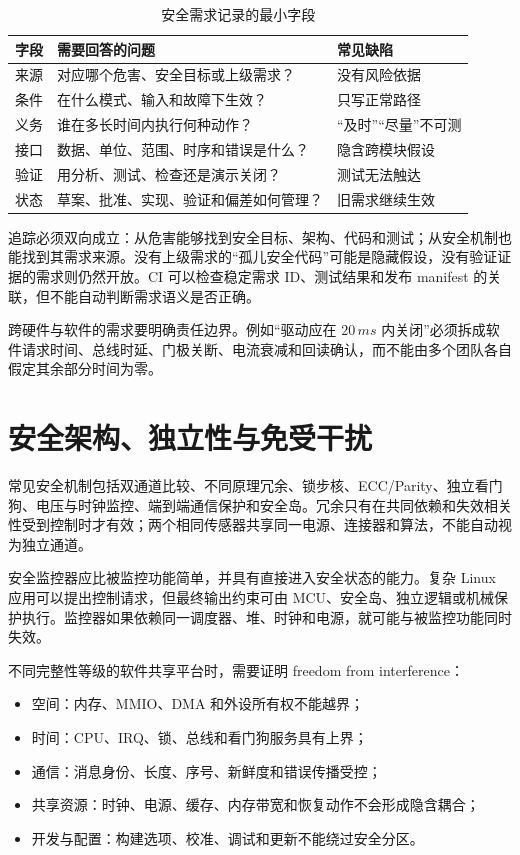\begin{table}[H]
  \centering
  \caption{安全需求记录的最小字段}
  \begin{tabular}{p{28mm}p{48mm}p{56mm}}
    \hline
    字段 & 需要回答的问题 & 常见缺陷 \\
    \hline
    来源 & 对应哪个危害、安全目标或上级需求？ & 没有风险依据 \\
    条件 & 在什么模式、输入和故障下生效？ & 只写正常路径 \\
    义务 & 谁在多长时间内执行何种动作？ & “及时”“尽量”不可测 \\
    接口 & 数据、单位、范围、时序和错误是什么？ & 隐含跨模块假设 \\
    验证 & 用分析、测试、检查还是演示关闭？ & 测试无法触达 \\
    状态 & 草案、批准、实现、验证和偏差如何管理？ & 旧需求继续生效 \\
    \hline
  \end{tabular}
\end{table}

追踪必须双向成立：从危害能够找到安全目标、架构、代码和测试；从安全机制也能找到其需求来源。没有上级需求的“孤儿安全代码”可能是隐藏假设，没有验证证据的需求则仍然开放。CI 可以检查稳定需求 ID、测试结果和发布 manifest 的关联，但不能自动判断需求语义是否正确。

跨硬件与软件的需求要明确责任边界。例如“驱动应在 $20\,ms$ 内关闭”必须拆成软件请求时间、总线时延、门极关断、电流衰减和回读确认，而不能由多个团队各自假定其余部分时间为零。

\section{安全架构、独立性与免受干扰}

常见安全机制包括双通道比较、不同原理冗余、锁步核、ECC/Parity、独立看门狗、电压与时钟监控、端到端通信保护和安全岛。冗余只有在共同依赖和失效相关性受到控制时才有效；两个相同传感器共享同一电源、连接器和算法，不能自动视为独立通道。

安全监控器应比被监控功能简单，并具有直接进入安全状态的能力。复杂 Linux 应用可以提出控制请求，但最终输出约束可由 MCU、安全岛、独立逻辑或机械保护执行。监控器如果依赖同一调度器、堆、时钟和电源，就可能与被监控功能同时失效。

不同完整性等级的软件共享平台时，需要证明 freedom from interference：

\begin{itemize}
  \item 空间：内存、MMIO、DMA 和外设所有权不能越界；
  \item 时间：CPU、IRQ、锁、总线和看门狗服务具有上界；
  \item 通信：消息身份、长度、序号、新鲜度和错误传播受控；
  \item 共享资源：时钟、电源、缓存、内存带宽和恢复动作不会形成隐含耦合；
  \item 开发与配置：构建选项、校准、调试和更新不能绕过安全分区。
\end{itemize}

